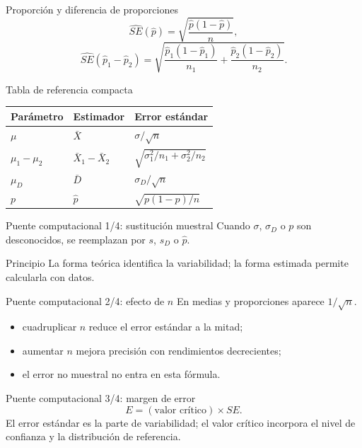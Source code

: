 \documentclass[10pt,aspectratio=169]{beamer}
\begin{document}
\begin{frame}{Proporción y diferencia de proporciones}
  \footnotesize
  \[
    \widehat{SE}(\hat p)=\sqrt{\frac{\hat p(1-\hat p)}{n}},
  \]
  \[
    \widehat{SE}(\hat p_1-\hat p_2)=
    \sqrt{\frac{\hat p_1(1-\hat p_1)}{n_1}+
    \frac{\hat p_2(1-\hat p_2)}{n_2}}.
  \]
\end{frame}

\begin{frame}{Tabla de referencia compacta}
  \footnotesize
  \begin{tabular}{lll}
    \hline
    Parámetro & Estimador & Error estándar \\
    \hline
    $\mu$ & $\bar X$ & $\sigma/\sqrt n$ \\
    $\mu_1-\mu_2$ & $\bar X_1-\bar X_2$ & $\sqrt{\sigma_1^2/n_1+\sigma_2^2/n_2}$ \\
    $\mu_D$ & $\bar D$ & $\sigma_D/\sqrt n$ \\
    $p$ & $\hat p$ & $\sqrt{p(1-p)/n}$ \\
    \hline
  \end{tabular}
\end{frame}

\begin{frame}{Puente computacional 1/4: sustitución muestral}
  \footnotesize
  Cuando $\sigma$, $\sigma_D$ o $p$ son desconocidos, se reemplazan por $s$,
  $s_D$ o $\hat p$.
  \begin{block}{Principio}
    La forma teórica identifica la variabilidad; la forma estimada permite
    calcularla con datos.
  \end{block}
\end{frame}

\begin{frame}{Puente computacional 2/4: efecto de $n$}
  \footnotesize
  En medias y proporciones aparece $1/\sqrt n$.
  \begin{itemize}\itemsep=0.12cm
    \item cuadruplicar $n$ reduce el error estándar a la mitad;
    \item aumentar $n$ mejora precisión con rendimientos decrecientes;
    \item el error no muestral no entra en esta fórmula.
  \end{itemize}
\end{frame}

\begin{frame}{Puente computacional 3/4: margen de error}
  \footnotesize
  \[
    E=(\text{valor crítico})\times SE.
  \]
  El error estándar es la parte de variabilidad; el valor crítico incorpora el
  nivel de confianza y la distribución de referencia.
\end{frame}
\end{document}

